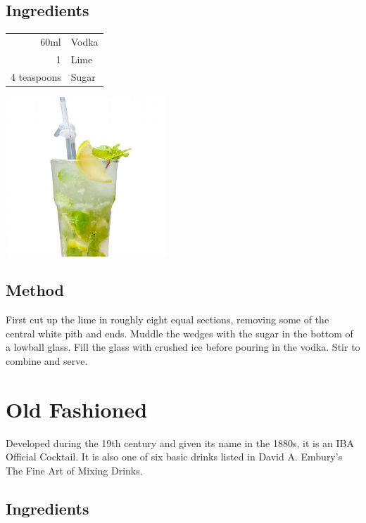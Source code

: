 \documentclass[12pt, letterpaper]{article}
\begin{document}
\subsection*{Ingredients}

\begin{multicols}{2}

\begin{tabular} { r | l}
    60ml & Vodka \\
    1 & Lime \\
    4 teaspoons & Sugar
\end{tabular}

\includegraphics[height=6cm]{caiprioska}

\end{multicols}

\subsection*{Method}
First cut up the lime in roughly eight equal sections, removing some of the central white pith and ends.
Muddle the wedges with the sugar in the bottom of a lowball glass.
Fill the glass with crushed ice before pouring in the vodka. Stir to combine and serve.

\pagebreak
\section{Old Fashioned}
Developed during the 19th century and given its name in the 1880s, it is an IBA Official Cocktail.
It is also one of six basic drinks listed in David A. Embury's The Fine Art of Mixing Drinks.

\subsection*{Ingredients}
\end{document}
